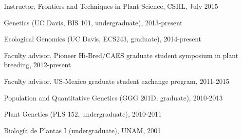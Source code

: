 \documentclass[letterpaper,10pt]{article}
\renewenvironment{itemize}{
  \begin{list}{}{
    \setlength{\leftmargin}{1.5em}
  }
}{
  \end{list}
}
\begin{document}
\begin{itemize}
\item Instructor, Frontiers and Techniques in Plant Science, CSHL, July 2015
\item Genetics (UC Davis, BIS 101, undergraduate), 2013-present
\item Ecological Genomics (UC Davis, ECS243, graduate), 2014-present
\item Faculty advisor, Pioneer Hi-Bred/CAES graduate student symposium in plant breeding, 2012-present
\item Faculty advisor, US-Mexico graduate student exchange program, 2011-2015
\item Population and Quantitative Genetics (GGG 201D, graduate), 2010-2013 %
\item Plant Genetics (PLS 152, undergraduate), 2010-2011 %
\item Biolog\'{i}a de Plantas I (undergraduate), UNAM, 2001
\end{itemize}
\end{document}
